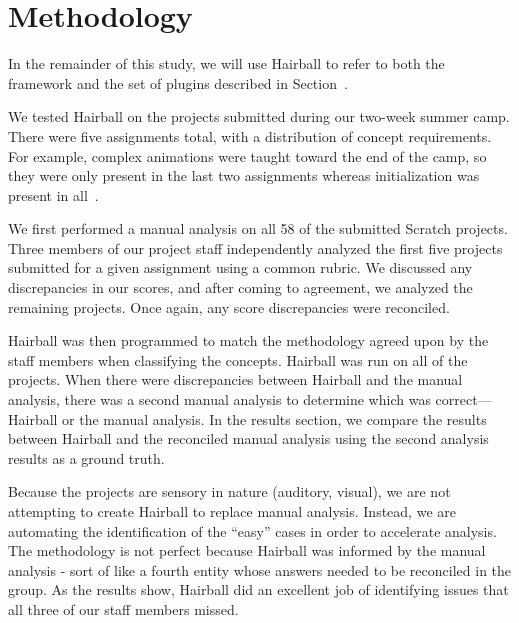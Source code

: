 \section{Methodology} 
In the remainder of this study, we will use Hairball to refer to both the
framework and the set of plugins described in Section~.

We tested Hairball on the projects submitted during our two-week summer camp.
There were five assignments total, with a distribution of concept
requirements. For example, complex animations were taught toward the end of the
camp, so they were only present in the last two assignments whereas
initialization was present in all~\cite{Franklin:2013:SBO}.

We first performed a manual analysis on all 58 of the submitted Scratch
projects.  Three members of our project staff independently analyzed the first
five projects submitted for a given assignment using a common rubric. We
discussed any discrepancies in our scores, and after coming to agreement, we
analyzed the remaining projects.  Once again, any score discrepancies were
reconciled.

Hairball was then programmed to match the methodology agreed upon by the staff
members when classifying the concepts.  Hairball was run on all of the
projects.  When there were discrepancies between Hairball and the manual
analysis, there was a second manual analysis to determine which was
correct---Hairball or the manual analysis.  In the results section, we compare
the results between Hairball and the reconciled manual analysis using the
second analysis results as a ground truth.

Because the projects are sensory in nature (auditory, visual), we are not
attempting to create Hairball to replace manual analysis.  Instead, we are
automating the identification of the ``easy'' cases in order to accelerate
analysis.  The methodology is not perfect because Hairball was informed by the
manual analysis - sort of like a fourth entity whose answers needed to be
reconciled in the group.  As the results show, Hairball did an excellent job of
identifying issues that all three of our staff members missed.
